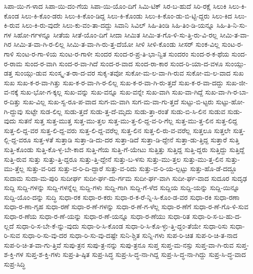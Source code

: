 {ಸಿಪಾ-ಯಿ-ಗ-ಳಾದ
ಸಿಪಾ-ಯಿ-ದಂ-ಗೆಯ
ಸಿಪಾ-ಯಿ-ಯೊಂ-ದಿಗೆ
ಸಿಮಿ-ಟಿಕ್
ಸಿರ-ಬ-ಹುದೆ
ಸಿರಿ-ರಕ್ಷೆ
ಸಿಲುಕಿ
ಸಿಲು-ಕಿ-ಕೊಂಡ
ಸಿಲು-ಕಿ-ಕೊಂ-ಡರು
ಸಿಲು-ಕಿ-ಕೊಂ-ಡಿದ್ದ
ಸಿಲು-ಕಿ-ಕೊಂಡು
ಸಿಲು-ಕಿ-ಕೊಂ-ಡು-ಬಿ-ಟ್ಟಿ-ದ್ದರು
ಸಿಲು-ಕಿದ
ಸಿಲು-ಕಿ-ರುವ
ಸಿಲು-ಕಿ-ರು-ವುದೇ
ಸಿಲು-ಕು-ವಂ-ತಾ-ದದ್ದು
ಸಿವಾನಿ
ಸಿವಿಲ್
ಸಿಹಿ-ತಿಂಡಿ
ಸಿಹಿ-ತಿಂ-ಡಿ-ಯನ್ನೂ
ಸಿಹಿ-ತಿ-ನಿ-ಸು-ಗಳ
ಸಿಹೋ-ರ್ಗಳನ್ನೂ
ಸೀತೆಯ
ಸೀತೆ-ಯೊಂ-ದಿಗೆ
ಸೀದಾ
ಸೀಮಿತ
ಸೀಮಿ-ತ-ಗೊ-ಳಿ-ಸು-ತ್ತಿ-ರು-ವಿ-ರಲ್ಲ
ಸೀಮಿ-ತ-ವಾ-ಗಿರ
ಸೀಮಿ-ತ-ವಾ-ಗಿ-ರ-ಲಿಲ್ಲ
ಸೀಮಿ-ತ-ವಾ-ಗಿ-ರು-ತ್ತ-ದೆಯೋ
ಸೀಳಿ
ಸೀಳಿ-ಕೊಂಡು
ಸೀಸರ್
ಸುಂಕ-ವಿಲ್ಲ
ಸುಂಟ-ರ-ಗಾಳಿ
ಸುಂಟ-ರ-ಗಾ-ಳಿಯ
ಸುಂಟ-ರ-ಗಾಳೀ
ಸುಂದರ
ಸುಂದ-ರ-ಪ್ರ-ತಿ-ಭಾ-ನ್ವಿತ
ಸುಂದರಂ
ಸುಂದ-ರ-ಕ-ಥೆಯ
ಸುಂದ-ರ-ರಾಮ
ಸುಂದ-ರ-ವಾಗಿ
ಸುಂದ-ರ-ವಾ-ಗಿದೆ
ಸುಂದ-ರ-ವಾದ
ಸುಂದ-ರಾ-ಕಾರ
ಸುಂದ-ರಿ-ಯಾ-ದ-ವಳೂ
ಸುಂಯ್ಗು-ಡತ್ತ
ಸುಂಯ್ಗು-ಡುವ
ಸುಂಸ್ಕೃ-ತ-ರಾ-ದ-ವರ
ಸುಕೃ-ತವೋ
ಸುಕೋ-ಮ-ಲ-ವಾ-ಗಿ-ರುವ
ಸುಕೋ-ಮ-ಲ-ವಾದ
ಸುಖ
ಸುಖ
ಸುಖ-ಕ-ರ-ವಾ-ಗಿತ್ತು
ಸುಖ-ಕ-ರ-ವಾ-ಗಿ-ರ-ಲಿಲ್ಲ
ಸುಖ-ಕ-ರ-ವಾ-ಗಿ-ರು-ತ್ತದೆ
ಸುಖ-ಕ-ರ-ವಾ-ದದ್ದು
ಸುಖ-ಜೀ-ವ-ನಕ್ಕೆ
ಸುಖ-ಭೋ-ಗ-ಕ್ಕಲ್ಲ
ಸುಖ-ವನ್ನು
ಸುಖ-ವನ್ನೂ
ಸುಖ-ವನ್ನೇ
ಸುಖ-ವಾಗಿ
ಸುಖ-ವಾ-ಗಿದ್ದೆ
ಸುಖ-ವಾ-ಗಿ-ರ-ಬಾ-ರ-ದಿತ್ತು
ಸುಖ-ವಿಲ್ಲ
ಸುಖ-ಸ್ವ-ರೂ-ಪ-ವಾದ
ಸುಗ-ಮ-ವಾಗಿ
ಸುಗ-ಮ-ವಾ-ಗು-ತ್ತದೆ
ಸುಟ್ಟು-ಬಿ-ಟ್ಟರು
ಸುಟ್ಟು-ಹೋ-ಗಿ-ದ್ದುವು
ಸುಟ್ಟೇ
ಸುಡ-ಲಿಲ್ಲ
ಸುಡು-ತ್ತದೆ
ಸುಡು-ತ್ತ-ದೆ-ಮೃದು
ಸುಡು-ತ್ತಾ-ರಂತೆ
ಸುಡು-ಬಿ-ಸಿ-ಲಿನ
ಸುಡುವ
ಸುಡು-ವುದು
ಸುತನೆ
ಸುತ್ತ
ಸುತ್ತ-ಮುತ್ತ
ಸುತ್ತ-ಮು-ತ್ತಲ
ಸುತ್ತ-ಮು-ತ್ತ-ಲಿ-ದ್ದ-ವ-ರಿ-ಗೆಲ್ಲ
ಸುತ್ತ-ಮು-ತ್ತ-ಲಿನ
ಸುತ್ತ-ಲಿದ್ದ
ಸುತ್ತ-ಲಿ-ದ್ದ-ವರ
ಸುತ್ತ-ಲಿ-ದ್ದ-ವರು
ಸುತ್ತ-ಲಿ-ದ್ದ-ವರೆಲ್ಲ
ಸುತ್ತ-ಲಿನ
ಸುತ್ತ-ಲಿ-ರು-ವ-ವರೆಲ್ಲ
ಸುತ್ತಲೂ
ಸುತ್ತಲೇ
ಸುತ್ತ-ಲ್ಲಿ-ದ್ದ-ವರೂ
ಸುತ್ತ-ಳತೆ
ಸುತ್ತಾಡಿ
ಸುತ್ತಾ-ಡಿ-ದು-ದರ
ಸುತ್ತಾ-ಡಿದೆ
ಸುತ್ತಾ-ಡಿ-ದ್ದೇನೆ
ಸುತ್ತಾ-ಡು-ತ್ತಿದ್ದ
ಸುತ್ತಾರೆ
ಸುತ್ತಿ
ಸುತ್ತಿ-ಕೊಂಡು
ಸುತ್ತಿ-ಕೊ-ಳ್ಳ-ಬೇ-ಕಾದ
ಸುತ್ತಿ-ಗೆಯ
ಸುತ್ತಿ-ಗೆ-ಯೇಟು
ಸುತ್ತಿತ್ತು
ಸುತ್ತಿದ್ದ
ಸುತ್ತಿ-ದ್ದರು
ಸುತ್ತಿದ್ದು
ಸುತ್ತಿದ್ದೆ
ಸುತ್ತಿ-ರುವ
ಸುತ್ತು
ಸುತ್ತು-ತ್ತಿ-ದ್ದರೂ
ಸುತ್ತು-ತ್ತಿ-ದ್ದೇನೆ
ಸುತ್ತು-ಬ-ಳಸು
ಸುತ್ತು-ಮು-ತ್ತಲ
ಸುತ್ತು-ಮು-ತ್ತ-ಲಿನ
ಸುತ್ತು-ಮು-ತ್ತೆಲ್ಲ
ಸುತ್ತು-ವ-ರಿದ
ಸುತ್ತು-ವ-ರಿ-ದಿ-ದ್ದಾರೆ
ಸುತ್ತು-ವ-ರಿದು
ಸುತ್ತು-ವ-ರಿ-ಯ-ಲ್ಪಟ್ಟು
ಸುತ್ತು-ಹೊ-ಡೆ-ದದ್ದೂ
ಸುದಾಮ
ಸುದಾ-ಮ-ಪುರಿ
ಸುದೀರ್ಘ
ಸುದೀ-ರ್ಘ-ದು-ರ್ಗಮ
ಸುದೀ-ರ್ಘ-ವಾಗಿ
ಸುದೀ-ರ್ಘ-ವಾದ
ಸುದೂರ
ಸುದೃಢ
ಸುದ್ದಿ
ಸುದ್ದಿ-ಗಳನ್ನು
ಸುದ್ದಿ-ಗಳನ್ನೆಲ್ಲ
ಸುದ್ದಿ-ಗಳು
ಸುದ್ದಿ-ಗಾಗಿ
ಸುದ್ದಿ-ಗೆ-ಳೆದ
ಸುದ್ದಿಯ
ಸುದ್ದಿ-ಯನ್ನು
ಸುದ್ದಿ-ಯಿನ್ನೂ
ಸುದ್ದಿ-ಯೊಂ-ದನ್ನು
ಸುದ್ಧಿ
ಸುಧಾ-ರಕ
ಸುಧಾ-ರ-ಕರು
ಸುಧಾ-ರ-ಕ-ರೆ-ನ್ನಿ-ಸಿ-ಕೊಂ-ಡ-ವರ
ಸುಧಾ-ರಕಿ
ಸುಧಾ-ರಣಾ
ಸುಧಾ-ರ-ಣಾ-ಗೃಹ
ಸುಧಾ-ರಣೆ
ಸುಧಾ-ರ-ಣೆ-ಗಳನ್ನು
ಸುಧಾ-ರ-ಣೆ-ಗ-ಳೆಲ್ಲ
ಸುಧಾ-ರ-ಣೆಗೆ
ಸುಧಾ-ರ-ಣೆ-ಗೊ-ಳಿ-ಸುವ
ಸುಧಾ-ರ-ಣೆಯ
ಸುಧಾ-ರ-ಣೆ-ಯನ್ನು
ಸುಧಾ-ರ-ಣೆ-ಯನ್ನೂ
ಸುಧಾ-ರ-ಣೆಯು
ಸುಧಾ-ರಿತ
ಸುಧಾ-ರಿ-ಸ-ಬ-ಹು-ದ-ಲ್ಲದೆ
ಸುಧಾ-ರಿ-ಸ-ಬೇ-ಕೆ-ನ್ನು-ವುದು
ಸುಧಾ-ರಿ-ಸಿ-ಕೊಂಡ
ಸುಧಾ-ರಿ-ಸಿ-ಕೊ-ಳ್ಳು-ತ್ತಿ-ದ್ದಂ-ತೆಯೇ
ಸುಧಾ-ರಿಸು
ಸುಧಾ-ರಿ-ಸುವ
ಸುಧಾ-ರಿ-ಸು-ವು-ದರ
ಸುಧಾ-ರಿ-ಸು-ವು-ದಷ್ಟೇ
ಸುನಿ-ಶ್ಚಿತ
ಸುನ್ನಿ-ಗಳು
ಸುಪ-ರಿ-ಚಿತ
ಸುಪ-ರಿ-ಚಿ-ತ-ನಾದ
ಸುಪ-ರಿ-ಚಿ-ತ-ವಾ-ಗು-ತ್ತಿವೆ
ಸುಪು-ತ್ರನ
ಸುಪು-ತ್ರ-ನನ್ನು
ಸುಪು-ತ್ರನೂ
ಸುಪ್ತ
ಸುಪ್ತ-ಮ-ನಸ್ಸು
ಸುಪ್ತ-ವಾ-ಗಿ-ರುವ
ಸುಪ್ತ-ಶ-ಕ್ತಿ-ಗಳ
ಸುಪ್ತ-ಶ-ಕ್ತಿ-ಗಳು
ಸುಪ್ರ-ತಿ-ಷ್ಠಿತ
ಸುಪ್ರ-ಸಿದ್ಧ
ಸುಪ್ರ-ಸಿ-ದ್ಧ-ನಾ-ಗಿದ್ದ
ಸುಪ್ರ-ಸಿ-ದ್ಧ-ನಾ-ಗಿದ್ದು
ಸುಪ್ರ-ಸಿ-ದ್ಧ-ವಾದ
ಸುಪ್ರ-ಸಿದ್ಧಿ
}
